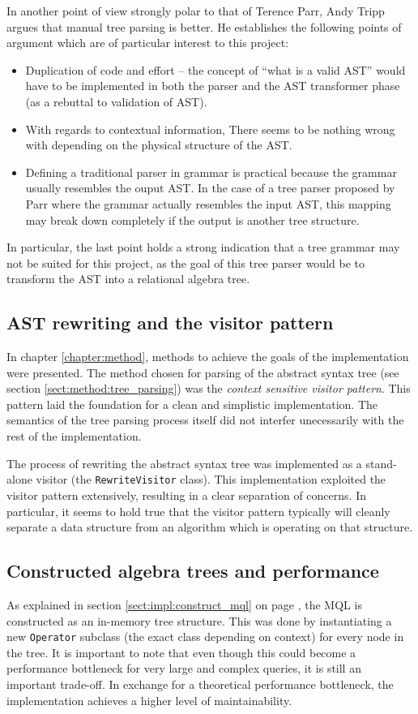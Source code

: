 In another point of view strongly polar to that of Terence Parr, Andy Tripp
argues that manual tree parsing is better\cite{manual_tree_walking_is_better}. He establishes the following points
of argument which are of particular interest to this project:
\begin{itemize}
  \item Duplication of code and effort -- the concept of ``what is a valid AST''
  would have to be implemented in both the parser and the AST transformer phase
  (as a rebuttal to validation of AST).
  \item With regards to contextual information, There seems to be nothing wrong
  with depending on the physical structure of the AST.
  \item Defining a traditional parser in grammar is practical because the grammar
  usually resembles the ouput AST. In the case of a tree parser proposed by Parr
  where the grammar actually resembles the input AST, this mapping may break
  down completely if the output is another tree structure.
\end{itemize}

In particular, the last point holds a strong indication that a tree grammar
may not be suited for this project, as the goal of this tree parser would be to
transform the AST into a relational algebra tree.

\subsection{AST rewriting and the visitor pattern}
In chapter \ref{chapter:method}, methods to achieve the goals
of the implementation were presented. The method chosen for parsing of the
abstract syntax tree (see section \ref{sect:method:tree_parsing}) was the
\emph{context sensitive visitor pattern}. This pattern laid the foundation for
a clean and simplistic implementation. The semantics of the tree parsing process
itself did not interfer unecessarily with the rest of the implementation.

The process of rewriting the abstract syntax tree was implemented as a
stand-alone visitor (the \texttt{RewriteVisitor} class). This implementation
exploited the visitor pattern extensively, resulting in a clear separation of
concerns. In particular, it seems to hold true that the visitor pattern
typically will cleanly separate a data structure from an algorithm which is
operating on that structure.

\subsection{Constructed algebra trees and performance}
As explained in section \ref{sect:impl:construct_mql} on page
\pageref{sect:impl:construct_mql}, the MQL is constructed as an in-memory tree
structure. This was done by instantiating a new \texttt{Operator} subclass
(the exact class depending on context) for every node in the tree. It is
important to note that even though this could become a performance bottleneck
for very large and complex queries, it is still an important trade-off. In
exchange for a theoretical performance bottleneck, the implementation achieves a
higher level of maintainability.